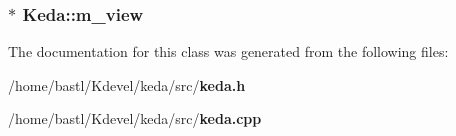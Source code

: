 \subsubsection{$\ast$ {\bf Keda::m\_\-view}}\label{classKeda_a06a9e343f346d86613242772a3ab385}




The documentation for this class was generated from the following files:\begin{CompactItemize}
\item 
/home/bastl/Kdevel/keda/src/{\bf keda.h}\item 
/home/bastl/Kdevel/keda/src/{\bf keda.cpp}\end{CompactItemize}
